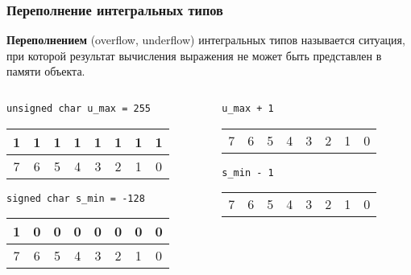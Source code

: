 \documentclass[compress, 8pt]{beamer}
\newenvironment{eightbit}{%
    \begin{center}
        \begin{tabular}{ |m{0.2cm}|m{0.2cm}|m{0.2cm}|m{0.2cm}|m{0.2cm}|m{0.2cm}|m{0.2cm}|m{0.2cm}|  }
            \hline
}{
        \hline
        \multicolumn{1}{c}{\color{gray}\tiny{7}} &
        \multicolumn{1}{c}{\color{gray}\tiny{6}} &
        \multicolumn{1}{c}{\color{gray}\tiny{5}} &
        \multicolumn{1}{c}{\color{gray}\tiny{4}} &
        \multicolumn{1}{c}{\color{gray}\tiny{3}} &
        \multicolumn{1}{c}{\color{gray}\tiny{2}} &
        \multicolumn{1}{c}{\color{gray}\tiny{1}} &
        \multicolumn{1}{c}{\color{gray}\tiny{0}} \\
        \end{tabular}
    \end{center}
}
\begin{document}
\begin{frame}[fragile]

    \frametitle{Переполнение интегральных типов}

    \textbf{Переполнением} (overflow, underflow) интегральных типов
    называется ситуация, при которой результат вычисления выражения
    не может быть представлен в памяти объекта.

    \hfill \break

    \begin{columns}[T]

        \begin{column}{0.5\textwidth}

            \verb|unsigned char u_max = 255|

            \begin{eightbit}
                1 & 1 & 1 & 1 & 1 & 1 & 1 & 1 \\
            \end{eightbit}

            \verb|signed char s_min = -128|

            \begin{eightbit}
                1 & 0 & 0 & 0 & 0 & 0 & 0 & 0 \\
            \end{eightbit}

        \end{column}

        \begin{column}{0.5\textwidth}

            \verb|u_max + 1|

            \begin{eightbit}
                \color{red}{?} &
                \color{red}{?} &
                \color{red}{?} &
                \color{red}{?} &
                \color{red}{?} &
                \color{red}{?} &
                \color{red}{?} &
                \color{red}{?} \\
            \end{eightbit}

            \verb|s_min - 1|

            \begin{eightbit}
                \color{red}{?} &
                \color{red}{?} &
                \color{red}{?} &
                \color{red}{?} &
                \color{red}{?} &
                \color{red}{?} &
                \color{red}{?} &
                \color{red}{?} \\
            \end{eightbit}

        \end{column}

    \end{columns}

\end{frame}
\end{document}
